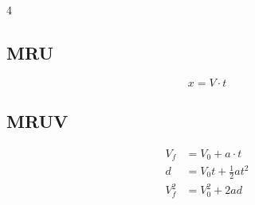 \documentclass[9pt, landscape, letterpaper]{extarticle}
\begin{document}
\begin{multicols}{4}
  \subsection{MRU}

  \begin{formulabox}
    $$x = V \cdot t$$
  \end{formulabox}

  \subsection{MRUV}

  \begin{formulabox}
    \begin{align*}
      V_f   & = V_0 + a \cdot t            \\
      d     & = V_0 t + \tfrac{1}{2} a t^2 \\
      V_f^2 & = V_0^2 + 2 a d
    \end{align*}
    \vspace{-8pt}
  \end{formulabox}

\end{multicols}



\end{document}
